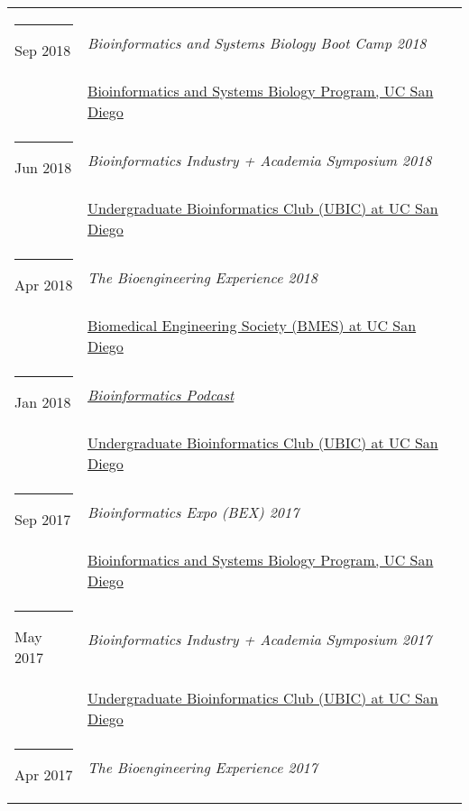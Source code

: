 \documentclass[margin,line]{res}
\begin{document}
\begin{resume}
\begin{longtable}{@{}p{0.7in}p{4in}}
\hspace*{-4mm} \rule{-1mm}{5mm} Sep 2018 & \textit{Bioinformatics and Systems Biology Boot Camp 2018}\\*
\hspace*{-4mm} & \hspace{4mm} \href{http://bioinformatics.ucsd.edu/}{Bioinformatics and Systems Biology Program, UC San Diego}\\
\hspace*{-4mm} \rule{-1mm}{5mm} Jun 2018 & \textit{Bioinformatics Industry + Academia Symposium 2018}\\*
\hspace*{-4mm} & \hspace{4mm} \href{http://ubicucsd.github.io/}{Undergraduate Bioinformatics Club (UBIC) at UC San Diego}\\
\hspace*{-4mm} \rule{-1mm}{5mm} Apr 2018 & \textit{The Bioengineering Experience 2018}\\*
\hspace*{-4mm} & \hspace{4mm} \href{http://bmes.ucsd.edu/}{Biomedical Engineering Society (BMES) at UC San Diego}\\
\hspace*{-4mm} \rule{-1mm}{5mm} Jan 2018 & \href{https://soundcloud.com/ubicucsd/ubic-podcast-episode-1}{\textit{Bioinformatics Podcast}}\\*
\hspace*{-4mm} & \hspace{4mm} \href{http://ubicucsd.github.io/}{Undergraduate Bioinformatics Club (UBIC) at UC San Diego}\\
\hspace*{-4mm} \rule{-1mm}{5mm} Sep 2017 & \textit{Bioinformatics Expo (BEX) 2017}\\*
\hspace*{-4mm} & \hspace{4mm} \href{http://bioinformatics.ucsd.edu/}{Bioinformatics and Systems Biology Program, UC San Diego}\\
\hspace*{-4mm} \rule{-1mm}{5mm} May 2017 & \textit{Bioinformatics Industry + Academia Symposium 2017}\\*
\hspace*{-4mm} & \hspace{4mm} \href{http://ubicucsd.github.io/}{Undergraduate Bioinformatics Club (UBIC) at UC San Diego}\\
\hspace*{-4mm} \rule{-1mm}{5mm} Apr 2017 & \textit{The Bioengineering Experience 2017}\\*

\end{longtable}
\end{resume}
\end{document}
